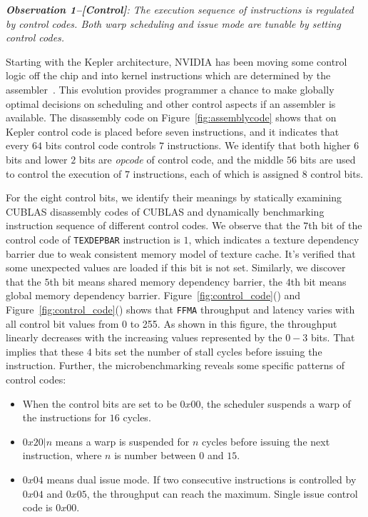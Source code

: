 {\em {\bf Observation 1--[Control]}: The execution sequence of instructions is regulated by control codes. Both warp 
scheduling and issue mode are tunable by setting control codes.}

Starting with the Kepler architecture, NVIDIA has been moving some control logic off the chip and into kernel 
instructions which are determined by the assembler~\cite{lai,maxas}. This evolution provides programmer a chance to 
make globally optimal decisions on scheduling and other control aspects if an assembler is available. The disassembly 
code on Figure~\ref{fig:assemblycode} shows that on Kepler control code is placed before seven instructions, and it 
indicates that every $64$ bits control code controls $7$ instructions. We identify that both higher $6$ bits and lower 
$2$ bits are {\em opcode} of control code, and the middle $56$ bits are used to control the execution of $7$ 
instructions, each of which is assigned $8$ control bits.

For the eight control bits, we identify their meanings by statically examining CUBLAS disassembly codes of CUBLAS and 
dynamically benchmarking instruction sequence of different control codes. We observe that the $7$th bit of the control 
code of {\tt TEXDEPBAR} instruction is $1$, which
indicates a texture dependency barrier due to weak consistent memory model of texture cache. It's verified that some 
unexpected values are
loaded if this bit is not set. Similarly, we discover that the $5$th bit means shared memory dependency barrier, the
$4$th bit means global memory dependency barrier. Figure~\ref{fig:control_code}() and 
Figure~\ref{fig:control_code}() shows that {\tt FFMA} throughput and latency varies with 
all control bit values from 0 to 255. As shown in this figure, the throughput linearly decreases with the increasing 
values represented by the $0-3$ bits. That implies that these $4$ bits set the number of stall cycles before issuing 
the instruction. Further, the microbenchmarking reveals some specific patterns of control codes:

\begin{itemize}
\item When the control bits are set to be $0x00$, the scheduler suspends a warp of the instructions for $16$ cycles.
\item $0x20|n$ means a warp is suspended for $n$ cycles before issuing the next instruction, where $n$ is number 
between $0$ and $15$.
\item $0x04$ means dual issue mode. If two consecutive instructions is controlled by $0x04$ and $0x05$, the throughput 
can reach the maximum. Single issue control code is $0x00$.
\end{itemize}


